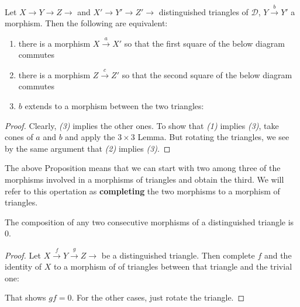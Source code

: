 \begin{prop}\label{a}
Let $X \longrightarrow Y \longrightarrow Z \longrightarrow$ and $X' \longrightarrow Y' \longrightarrow Z' \longrightarrow$ distinguished triangles of $\mathscr{D}$, $Y \overset{b}{\longrightarrow} Y'$ a morphism. Then the following are equivalent:  \\
\begin{enumerate}
\item there is a morphism $X \overset{a}{\longrightarrow} X'$ so that the first square of the below diagram commutes  
\item there is a morphism $Z \overset{c}{\longrightarrow} Z'$ so that the second square of the below diagram commutes  
\item $b$ extends to a morphism between the two triangles:
\end{enumerate} 
\begin{center}
\end{center}
\end{prop}

\begin{proof}
Clearly, \textit{(3)} implies the other ones. To show that \textit{(1)} implies \textit{(3)}, take cones of $a$ and $b$ and apply the $3 \times 3$ Lemma. But rotating the triangles, we see by the same argument that \textit{(2)} implies \textit{(3)}. 
\end{proof}

The above Proposition means that we can start with two among three of the morphisms involved in a morphisms of triangles and obtain the third. We will refer to this opertation as \textbf{completing} the two morphisms to a morphism of triangles. \\

\begin{prop}\label{b}
The composition of any two consecutive morphisms of a distinguished triangle is $0$.
\end{prop}

\begin{proof}
Let $X \overset{f}{\longrightarrow} Y \overset{g}{\longrightarrow} Z \longrightarrow$ be a distinguished triangle. Then complete $f$ and the identity of $X$ to a morphism of of triangles between that triangle and the trivial one: 
\begin{center}
\end{center}
That shows $gf=0$. For the other cases, just rotate the triangle.  
\end{proof}

